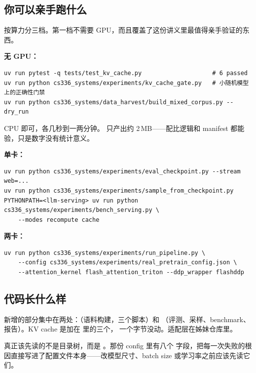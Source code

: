 \subsection{你可以亲手跑什么}
\label{sec:b-run}

按算力分三档。第一档不需要 GPU，而且覆盖了这份讲义里最值得亲手验证的东西。

\textbf{无 GPU：}
\begin{lstlisting}[style=hlshell]
uv run pytest -q tests/test_kv_cache.py                    # 6 passed
uv run python cs336_systems/experiments/kv_cache_gate.py   # 小随机模型上的正确性门禁
uv run python cs336_systems/data_harvest/build_mixed_corpus.py --dry_run
\end{lstlisting}
\resources CPU 即可，各几秒到一两分钟。 只产出约 2\,MB——配比逻辑和 manifest 都能验，只是数字没有统计意义。

\textbf{单卡：}
\begin{lstlisting}[style=hlshell]
uv run python cs336_systems/experiments/eval_checkpoint.py --stream web=...
uv run python cs336_systems/experiments/sample_from_checkpoint.py
PYTHONPATH=<llm-serving> uv run python cs336_systems/experiments/bench_serving.py \
    --modes recompute cache
\end{lstlisting}

\textbf{两卡：}
\begin{lstlisting}[style=hlshell]
uv run python cs336_systems/experiments/run_pipeline.py \
    --config cs336_systems/experiments/real_pretrain_config.json \
    --attention_kernel flash_attention_triton --ddp_wrapper flashddp
\end{lstlisting}

\subsection{代码长什么样}
\label{sec:b-layout}

新增的部分集中在两处：（语料构建，三个脚本）和 （评测、采样、benchmark、报告）。KV cache 是加在  里的三个， 一个字节没动。适配层在姊妹仓库里。

真正该先读的不是目录树，而是 。那份 config 里有八个  字段，把每一次失败的根因直接写进了配置文件本身——改模型尺寸、batch size 或学习率之前应该先读它们。

